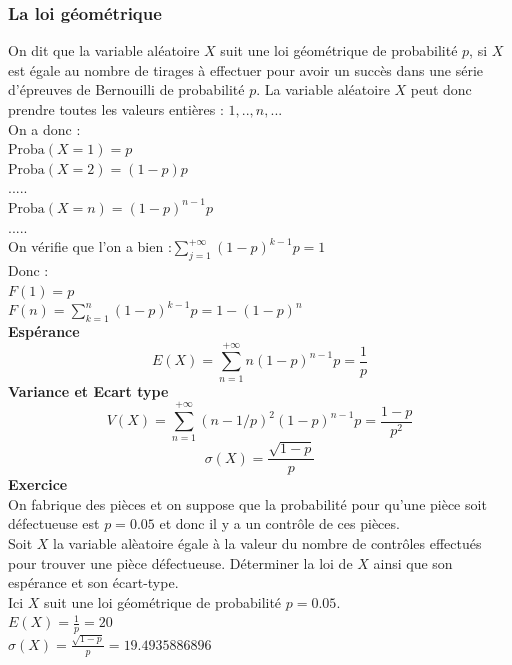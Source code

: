 \documentclass[a4paper,11pt]{book}
\begin{document}
\subsubsection{La loi g\'eom\'etrique}
On dit que la variable al\'eatoire $X$ suit une loi g\'eom\'etrique de 
probabilit\'e $p$, si $X$ est \'egale au nombre de tirages \`a effectuer pour
avoir un succ\`es dans une s\'erie d'\'epreuves de Bernouilli de probabilit\'e 
$p$. La variable al\'eatoire $X$ peut donc prendre toutes les valeurs 
enti\`eres : $1,..,n,..$.\\
On a donc :\\
$\mbox{Proba}(X=1)=p$\\
$\mbox{Proba}(X=2)=(1-p)p$\\
.....\\
$\mbox{Proba}(X=n)=(1-p)^{n-1}p$\\
.....\\
On v\'erifie que l'on a bien :$\sum_{j=1}^{+\infty}(1-p)^{k-1}p=1$\\
Donc :\\
$F(1)=p$\\
$F(n)=\sum_{k=1}^n(1-p)^{k-1}p=1-(1-p)^n$\\
{\bf Esp\'erance}
$$E(X)=\sum_{n=1}^{+\infty}n(1-p)^{n-1}p=\frac{1}{p}$$
{\bf Variance et Ecart type}
$$V(X)=\sum_{n=1}^{+\infty}(n-1/p)^2(1-p)^{n-1}p=\frac{1-p}{p^2}$$
$$\sigma(X)=\frac{\sqrt{1-p}}{p}$$
{\bf Exercice}\\
On fabrique des pi\`eces et on suppose que la probabilit\'e pour qu'une 
pi\`ece soit d\'efectueuse est $p=0.05$ et donc il y a un contr\^ole de 
ces pi\`eces.\\
Soit $X$ la variable al\`eatoire \'egale \`a la valeur du nombre de contr\^oles
effectu\'es pour trouver une pi\`ece d\'efectueuse.
D\'eterminer la loi de $X$ ainsi que son esp\'erance et son \'ecart-type.\\
Ici $X$ suit une loi g\'eom\'etrique de probabilit\'e $p=0.05$.\\
$E(X)=\frac{1}{p}=20$\\
$\sigma(X)=\frac{\sqrt{1-p}}{p}=19.4935886896$
\end{document}
